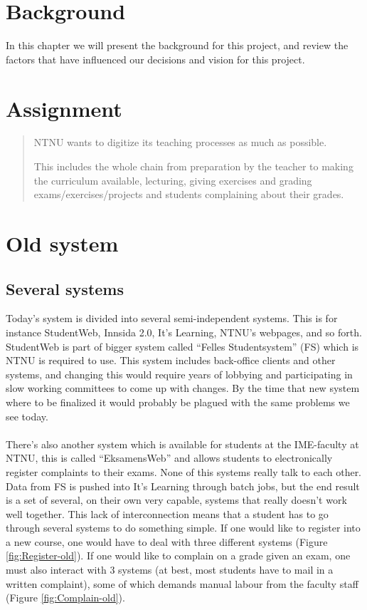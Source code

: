 \section{Background}
In this chapter we will present the background for this project, and review the factors that have
influenced our decisions and vision for this project.

\section{Assignment}

\begin{quote}
   NTNU wants to digitize its teaching processes as much as possible.\newline

   This includes the whole chain from preparation by the teacher to making the curriculum available, lecturing, giving exercises and grading exams/exercises/projects and students complaining about their grades.
\end{quote}

\section{Old system}
\subsection{Several systems}
Today's system is divided into several semi-independent systems. This is for instance StudentWeb, Innsida 2.0, It's Learning, NTNU's webpages, and so forth. 
StudentWeb is part of bigger system called ``Felles Studentsystem'' (FS) which is NTNU is required to use. This system includes back-office clients and other systems, and changing this
would require years of lobbying and participating in slow working committees to come up with changes. By the time that new system where to be finalized it would probably be plagued with the same problems we see today.
~\\\\
\noindent %
 There's also another system which is available for students at the IME-faculty at NTNU, this is called ``EksamensWeb'' and allows students to electronically register complaints to 
 their exams. None of this systems really talk to each other. Data from FS is pushed into It's Learning through batch jobs, but the end result is a set of several, on their own very capable, systems that really doesn't work well together.  
 This lack of interconnection means that a student has to go through several systems to do something simple. If one would like to register into a new course, one would have to deal with three different systems (Figure \ref{fig:Register-old}). If one would like to complain on a grade given an exam, one must also interact with 3 systems (at best, most students have to mail in a written complaint), some of which demands manual labour from the faculty staff (Figure \ref{fig:Complain-old}).

